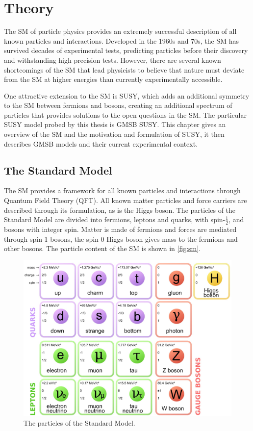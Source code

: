 \chapter{Theory}
\label{chap:theory}

The \acf{SM} of particle physics provides an extremely successful description of all known particles and interactions. Developed in the 1960s and 70s, the \ac{SM} has survived decades of experimental tests, predicting particles before their discovery and withstanding high precision tests. However, there are several known shortcomings of the \ac{SM} that lead physicists to believe that nature must deviate from the \ac{SM} at higher energies than currently experimentally accessible. 

One attractive extension to the \ac{SM} is \acf{SUSY}, which adds an additional symmetry to the \ac{SM} between fermions and bosons, creating an additional spectrum of particles that provides solutions to the open questions in the \ac{SM}. The particular \ac{SUSY} model probed by this thesis is \acf{GMSB} \ac{SUSY}. This chapter gives an overview of the \ac{SM} and the motivation and formulation of \ac{SUSY}, it then describes \ac{GMSB} models and their current experimental context. 


\section{The Standard Model}

The \acf{SM} provides a framework for all known particles and interactions through Quantum Field Theory (QFT). All known matter particles and force carriers are described through its formulation, as is the Higgs boson. The particles of the Standard Model are divided into fermions, leptons and quarks, with spin-$\frac{1}{2}$, and bosons with integer spin. Matter is made of fermions and forces are mediated through spin-1 bosons, the spin-0 Higgs boson gives mass to the fermions and other bosons. The particle content of the \ac{SM} is shown in \autoref{fig:sm}. 
 
\begin{figure}[htbp]
\centering
\includegraphics[width=.8\textwidth]{figures/theory/standard-model.jpg}
\caption{The particles of the Standard Model.}
\label{fig:sm}
\end{figure}


